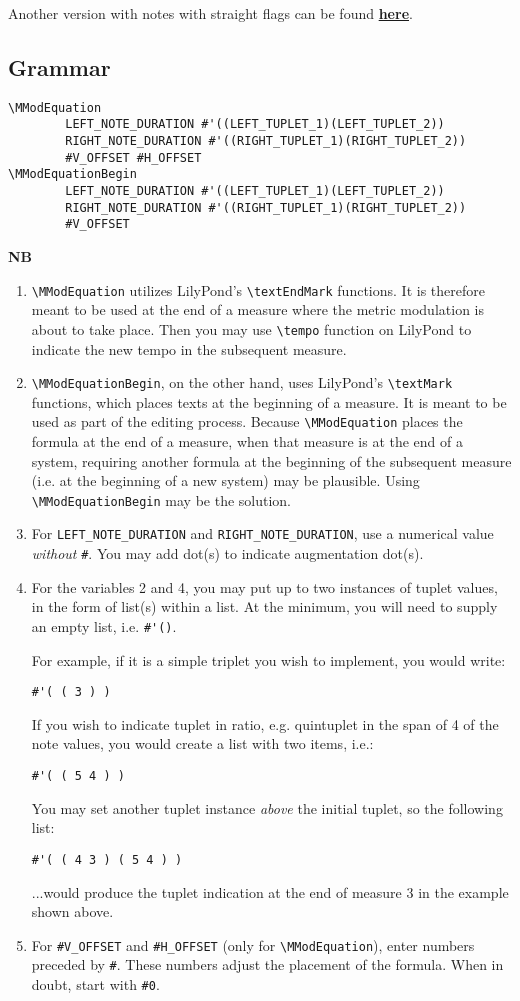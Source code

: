 Another version with notes with straight flags can be found \hyperref[sec:metricModulationStraightFlag]{\textbf{here}}.

\subsection{Grammar}
\begin{verbatim}
\MModEquation 
		LEFT_NOTE_DURATION #'((LEFT_TUPLET_1)(LEFT_TUPLET_2)) 
		RIGHT_NOTE_DURATION #'((RIGHT_TUPLET_1)(RIGHT_TUPLET_2)) 
		#V_OFFSET #H_OFFSET
\MModEquationBegin 
		LEFT_NOTE_DURATION #'((LEFT_TUPLET_1)(LEFT_TUPLET_2)) 
		RIGHT_NOTE_DURATION #'((RIGHT_TUPLET_1)(RIGHT_TUPLET_2)) 
		#V_OFFSET
\end{verbatim}

\textbf{NB} 
\begin{enumerate}
\item \verb|\MModEquation| utilizes LilyPond's \verb|\textEndMark| functions. It is therefore meant to be used at the end of a measure where the metric modulation is about to take place. Then you may use \verb|\tempo| function on LilyPond to indicate the new tempo in the subsequent measure. 
\item \verb|\MModEquationBegin|, on the other hand, uses LilyPond's \verb|\textMark| functions, which places texts at the beginning of a measure. It is meant to be used as part of the editing process. Because \verb|\MModEquation| places the formula at the end of a measure, when that measure is at the end of a system, requiring another formula at the beginning of the subsequent measure (i.e. at the beginning of a new system) may be plausible. Using \verb|\MModEquationBegin| may be the solution. 
\item For \verb|LEFT_NOTE_DURATION| and \verb|RIGHT_NOTE_DURATION|, use a numerical value \textit{without} \verb|#|. You may add dot(s) to indicate augmentation dot(s).  
\item For the variables 2 and 4, you may put up to two instances of tuplet values, in the form of list(s) within a list. At the minimum, you will need to supply an empty list, i.e. \verb|#'()|. 
\par 
For example, if it is a simple triplet you wish to implement, you would write: \par
\indent \verb|#'( ( 3 ) ) |
\par
If you wish to indicate tuplet in ratio, e.g. quintuplet in the span of 4 of the note values, you would create a list with two items, i.e.: 
\par
\indent \verb|#'( ( 5 4 ) )|
\par
You may set another tuplet instance \textit{above} the initial tuplet, so the following list: \par\hfill\par
\indent \verb|#'( ( 4 3 ) ( 5 4 ) )|
\par
...would produce the tuplet indication at the end of measure 3 in the example shown above.
\item For \verb|#V_OFFSET| and \verb|#H_OFFSET| (only for \verb|\MModEquation|), enter numbers preceded by \verb|#|. These numbers adjust the placement of the formula. When in doubt, start with \verb|#0|.


\end{enumerate}
